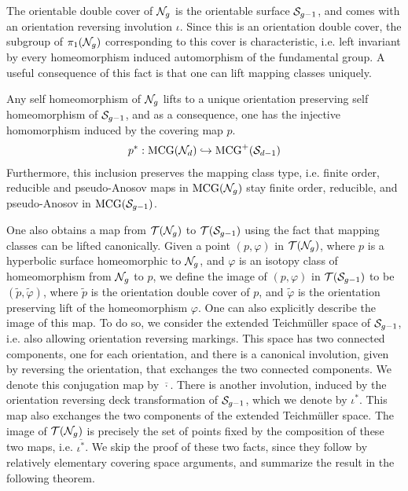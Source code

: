 \documentclass[12pt, reqno]{amsart}
\begin{document}
The orientable double cover of $\mathcal{N}_g$ is the orientable surface $\mathcal{S}_{g-1}$, and comes with an orientation reversing involution $\iota$.
Since this is an orientation double cover, the subgroup of $\pi_1(\mathcal{N}_g)$ corresponding to this cover is characteristic, i.e. left invariant by every homeomorphism induced automorphism of the fundamental group.
A useful consequence of this fact is that one can lift mapping classes uniquely.
\begin{fact}
  Any self homeomorphism of $\mathcal{N}_g$ lifts to a unique orientation preserving self homeomorphism of $\mathcal{S}_{g-1}$, and as a consequence, one has the injective homomorphism induced by the covering map $p$.
  \begin{align*}
    p^{\ast}: \mathrm{MCG}(\mathcal{N}_d) \hookrightarrow \mathrm{MCG}^+(\mathcal{S}_{d-1})
  \end{align*}
  Furthermore, this inclusion preserves the mapping class type, i.e. finite order, reducible and pseudo-Anosov maps in $\mathrm{MCG}(\mathcal{N}_g)$ stay finite order, reducible, and pseudo-Anosov in $\mathrm{MCG}(\mathcal{S}_{g-1})$.
\end{fact}

One also obtains a map from $\mathcal{T}(\mathcal{N}_g)$ to $\mathcal{T}(\mathcal{S}_{g-1})$ using the fact that mapping classes can be lifted canonically.
Given a point $(p, \varphi)$ in $\mathcal{T}(\mathcal{N}_g)$, where $p$ is a hyperbolic surface homeomorphic to $\mathcal{N}_g$, and $\varphi$ is an isotopy class of homeomorphism from $\mathcal{N}_g$ to $p$, we define the image of $(p, \varphi)$ in $\mathcal{T}(\mathcal{S}_{g-1})$ to be $(\widetilde{p}, \widetilde{\varphi})$, where $\widetilde{p}$ is the orientation double cover of $p$, and $\widetilde{\varphi}$ is the orientation preserving lift of the homeomorphism $\varphi$.
One can also explicitly describe the image of this map.
To do so, we consider the extended Teichmüller space of $\mathcal{S}_{g-1}$, i.e. also allowing orientation reversing markings.
This space has two connected components, one for each orientation, and there is a canonical involution, given by reversing the orientation, that exchanges the two connected components.
We denote this conjugation map by $\overline{\cdot}$.
There is another involution, induced by the orientation reversing deck transformation of $\mathcal{S}_{g-1}$, which we denote by $\iota^{\ast}$.
This map also exchanges the two components of the extended Teichmüller space.
The image of $\mathcal{T}(\mathcal{N}_g)$ is precisely the set of points fixed by the composition of these two maps, i.e. $\overline{\iota^{\ast}}$.
We skip the proof of these two facts, since they follow by relatively elementary covering space arguments, and summarize the result in the following theorem.
\end{document}
